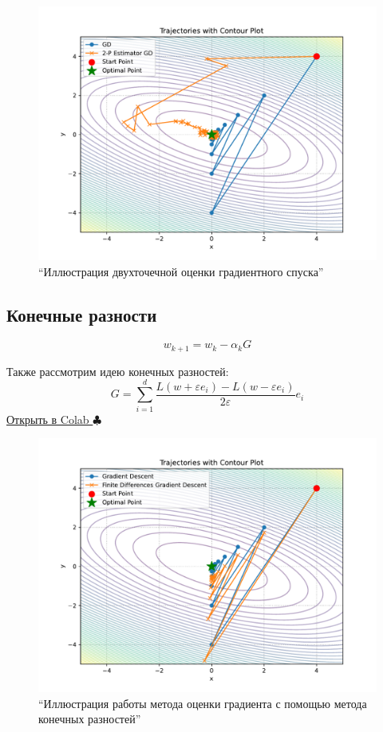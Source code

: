 \documentclass[
  russian,
  letterpaper,
  DIV=11,
  numbers=noendperiod]{scrartcl}
\begin{document}
\begin{figure}[H]

{\centering \includegraphics[width=0.8\linewidth,height=\textheight,keepaspectratio]{zgd_2p.pdf}

}

\caption{``Иллюстрация двухточечной оценки градиентного спуска''}

\end{figure}%

\subsection{Конечные
разности}\label{ux43aux43eux43dux435ux447ux43dux44bux435-ux440ux430ux437ux43dux43eux441ux442ux438}

\[
w_{k+1} = w_k - \alpha_k G
\]

Также рассмотрим идею конечных разностей: \[
G =  \sum\limits_{i=1}^d\dfrac{L(w+\varepsilon e_i) - L(w-\varepsilon e_i)}{2\varepsilon} e_i
\]
\href{https://colab.research.google.com/github/MerkulovDaniil/optim/blob/master/assets/Notebooks/Zero_order_GD.ipynb}{Открыть
в Colab \(\clubsuit\)}

\begin{figure}[H]

{\centering \includegraphics[width=0.8\linewidth,height=\textheight,keepaspectratio]{zgd_fd.pdf}

}

\caption{``Иллюстрация работы метода оценки градиента с помощью метода
конечных разностей''}

\end{figure}%
\end{document}
